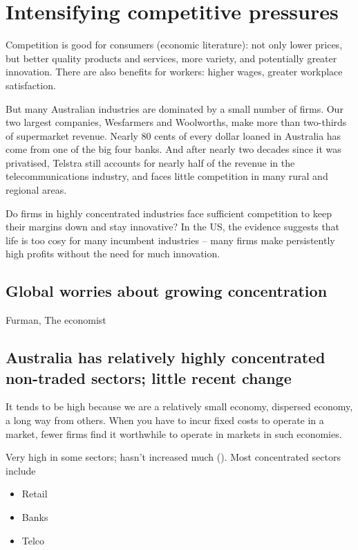 \chapter{Intensifying competitive pressures} \label{chap3}


Competition is good for consumers (economic literature): not only lower prices, but better quality products and services, more variety, and potentially greater innovation. There are also benefits for workers: higher wages, greater workplace satisfaction.

But many Australian industries are dominated by a small number of firms. Our two largest companies, Wesfarmers and Woolworths, make more than two-thirds of supermarket revenue. Nearly 80 cents of every dollar loaned in Australia has come from one of the big four banks. And after nearly two decades since it was privatised, Telstra still accounts for nearly half of the revenue in the telecommunications industry, and faces little competition in many rural and regional areas.

Do firms in highly concentrated industries face sufficient competition to keep their margins down and stay innovative? In the US, the evidence suggests that life is too cosy for many incumbent industries -- many firms make persistently high profits without the need for much innovation.

\section{Global worries about growing concentration}



Furman,
The economist



\section{Australia has relatively highly concentrated non-traded sectors; little recent change}

It tends to be high because we are a relatively small economy, dispersed economy, a long way from others. When you have to incur fixed costs to operate in a market, fewer firms find it worthwhile to operate in markets in such economies.

Very high in some sectors; hasn't increased much (). 
Most concentrated sectors include
\begin{itemize}
    \item Retail
    \item Banks
    \item Telco
\end{itemize} 

